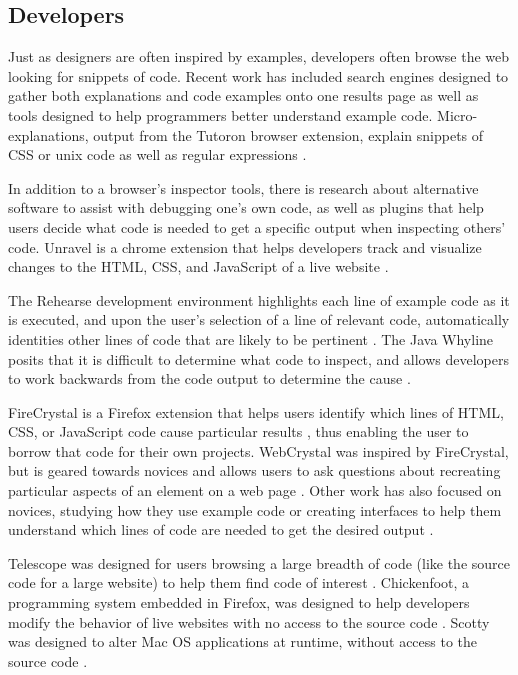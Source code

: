 \documentclass{sigchi}
\begin{document}
\subsection{Developers}
Just as designers are often inspired by examples, developers often browse the web looking for snippets of code. Recent work has included search engines designed to gather both explanations and code examples onto one results page \cite{assieme_web_search_for_programmers_Hoffmann_UIST_2007} as well as tools designed to help programmers better understand example code. Micro-explanations, output from the Tutoron browser extension, explain snippets of CSS or unix code as well as regular expressions \cite{Head_tutorons_generating_sketchy_no_conf_no_year}. 

In addition to a browser's inspector tools, there is research about alternative software to assist with debugging one's own code, as well as plugins that help users decide what code is needed to get a specific output when inspecting others' code. Unravel is a chrome extension that helps developers track and visualize changes to the HTML, CSS, and JavaScript of a live website \cite{unravel_rapid_web_app_reverse_engineering_Hibschman_UIST_2015}. 

The Rehearse development environment highlights each line of example code as it is executed, and upon the user's selection of a line of relevant code, automatically identities other lines of code that are likely to be pertinent \cite{rehearse_helping_programmers_adapt_examples_Brandt_ples_CSTR}. The Java Whyline posits that it is difficult to determine what code to inspect, and allows developers to work backwards from the code output to determine the cause \cite{java_whyline_Ko_CHI_2009}. 

FireCrystal is a Firefox extension that helps users identify which lines of HTML, CSS, or JavaScript code cause particular results \cite{firecrystal_oney_ieee_2013}, thus enabling the user to borrow that code for their own projects. WebCrystal was inspired by FireCrystal, but is geared towards novices and allows users to ask questions about recreating particular aspects of an element on a web page \cite{webcrystal_Chang_CHI_2012}. Other work has also focused on novices, studying how they use example code \cite{exploring_novice_programmer_example_use_ichinco_iee_2015} or creating interfaces to help them understand which lines of code are needed to get the desired output \cite{dinah_non_programmers_coding_Gross_CHI_2011}. 

Telescope was designed for users browsing a large breadth of code (like the source code for a large website) to help them find code of interest \cite{telescope_Hibschman_UIST_2016}. Chickenfoot, a programming system embedded in Firefox, was designed to help developers modify the behavior of live websites with no access to the source code \cite{auto_and_customization_of_rendered_web_Bolin_UIST_2005}. Scotty was designed to alter Mac OS applications at runtime, without access to the source code \cite{cracking_cocoa_nut_Eagan_UIST_2011}. 
\end{document}
